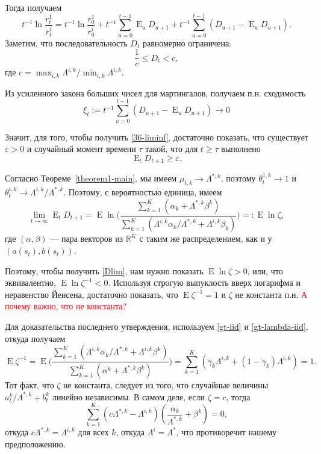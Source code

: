 \documentclass[a4paper,12pt,russian]{article} %
\theoremstyle{definition}
\DeclareMathOperator{\E}{E}
\renewcommand{\epsilon}{\varepsilon}
\newcommand{\R}{\mathbb{R}}
\begin{document}
Тогда получаем
\[
t^{-1} \ln \frac{r_t^1}{r_t^i} 
= t^{-1}\ln\frac{r_0^1}{r_0^i} + t^{-1}\sum_{u=0}^{t-1} \E_u D_{u+1} 
  + t^{-1}\sum_{u=0}^{t-1} (D_{u+1} - \E_u D_{u+1}).
\]
Заметим, что последовательность $D_t$ равномерно ограничена:
\[
\frac{1}{c} \le D_t < c,
\]
где $c=\max_{i,k} \Lambda^{i,k}/ \min_{i,k} \Lambda^{i,k}$.

Из усиленного закона больших чисел для мартингалов, получаем п.н. сходимость
$$\xi_t := t^{-1} \sum_{u=0}^{t-1} (D_{u+1} - \E_u D_{u+1}) \to 0 $$

Значит, для того, чтобы получить \eqref{36-liminf}, достаточно показать, что существует  $\epsilon>0$ и случайный момент времени $\tau$ такой, что для $t\ge \tau$ выполнено
\begin{equation}
\label{37-Dlim}
\E_t D_{t+1} \ge \epsilon.
\end{equation}

Согласно Теореме~\ref{theorem1-main}, мы имеем $\mu_{t,k} \to \Lambda^{*,k}$, поэтому $\theta_{t}^{1,k} \to 1$ и $\theta_{t}^{i,k} \to \Lambda^{i,k}/\Lambda^{*,k}$.
Поэтому, с вероятностью единица, имеем
\[
\lim_{t\to\infty} \E_t D_{t+1} = \E \ln\Biggl(
  \frac{\sum_{k=1}^K (\alpha_k + \Lambda^{*,k}\beta^k)}
       {\sum_{k=1}^K (\Lambda^{i,k} \alpha_k/\Lambda^{*,k} + \Lambda^{i,k}\beta_k)}
  \Biggr) =: \E \ln \zeta,
\]
где $(\alpha,\beta)$ — пара векторов из $\R^K$ с таким же распределением, как и у  $(a(s_t), b(s_t))$.

Поэтому, чтобы получить \eqref{Dlim}, нам нужно показать $\E \ln \zeta >0$, или, что эквивалентно, $\E \ln \zeta^{-1} < 0$.
Используя строгую выпуклость вверх логарифма и неравенство Йенсена, достаточно показать, что $\E \zeta^{-1} = 1$ и $\zeta$ не константа п.н. \textcolor{red} { А почему важно, что не константа?} 

Для доказательства последнего утверждения, используем \eqref{gt-iid} и \eqref{gt-lambda-iid}, откуда получаем
\[
\E \zeta^{-1} = \E \Biggl(
  \frac{\sum_{k=1}^K (\Lambda^{i,k} \alpha_k/\Lambda^{*,k}+ \Lambda^{i,k}\beta^k)}
       {\sum_{k=1}^K (\alpha^k + \Lambda^{*,k}\beta^k)}       
  \Biggr) = \sum_{k=1}^K (\gamma_k\Lambda^{i,k} + (1-\gamma_k)\Lambda^{i,k}) = 1.
\]
Тот факт, что $\zeta$ не константа, следует из того, что  случайные величины $a_{t}^k/\Lambda^{*,k} + b_{t}^k$ линейно независимы. В самом деле, если $\zeta=c$, тогда 
\[
\sum_{k=1}^K (c\Lambda^{*,k} - \Lambda^{i,k}) \left( \frac{\alpha_k}{\Lambda^{*,k}} + \beta^k\right) = 0 ,
\]
откуда $c\Lambda^{*,k} = \Lambda^{i,k}$ для всех $k$, откуда $\Lambda^i=\Lambda^*$, что противоречит нашему предположению. 
\end{document}
